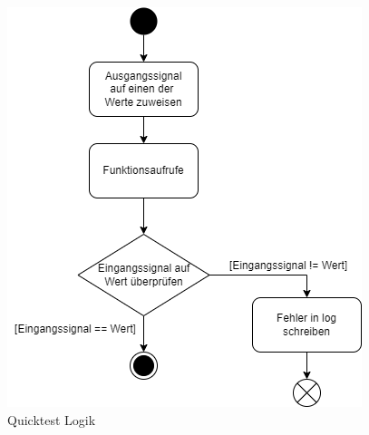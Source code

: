 \begin{figure}[h]
\centering
\includegraphics[scale=.6,]{Bilder/Quicktest/QuicktestLogik.drawio.png}
\caption{Quicktest Logik \cite[vgl.][]{quicktestc}}
\end{figure}














